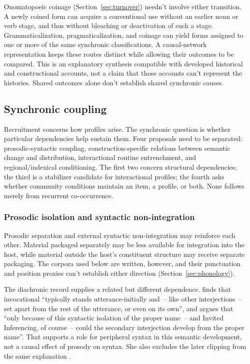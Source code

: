 \documentclass[12pt]{article}
\begin{document}
Onomatopoeic coinage (Section~\ref{sec:turnover}) needn't involve either transition. A newly coined form can acquire a conventional use without an earlier noun or verb stage, and thus without bleaching or deactivation of such a stage. Grammaticalization, pragmaticalization, and coinage can yield forms assigned to one or more of the same synchronic classifications. A causal-network representation keeps these routes distinct while allowing their outcomes to be compared. This is an explanatory synthesis compatible with developed historical and constructional accounts, not a claim that those accounts can't represent the histories. Shared outcomes alone don't establish shared synchronic causes.

\subsection{Synchronic coupling}\label{sec:synchronic-coupling}

Recruitment concerns how profiles arise. The synchronic question is whether particular dependencies help sustain them. Four proposals need to be separated: prosodic-syntactic coupling, construction-specific relations between semantic change and distribution, interactional routine entrenchment, and regional/indexical conditioning. The first two concern structural dependencies; the third is a stabilizer candidate for interactional profiles; the fourth asks whether community conditions maintain an item, a profile, or both. None follows merely from recurrent co-occurrence.

\subsubsection{Prosodic isolation and syntactic non-integration}

Prosodic separation and external syntactic non-integration may reinforce each other. Material packaged separately may be less available for integration into the host, while material outside the host's constituent structure may receive separate packaging. The corpora used below are written, however, and their punctuation and position proxies can't establish either direction (Section~\ref{sec:phonology}).

The diachronic record supplies a related but different dependence. \textcite[85]{gehweiler2008} finds that invocational  \enquote{typically stands utterance-initially and~-- like other interjections~-- set apart from the rest of the utterance, or even on its own}, and argues that \enquote{only because of this syntactic isolation of the proper name~-- and Invited Inferencing, of course~-- could the secondary interjection  develop from the proper name}. That supports a role for peripheral syntax in this semantic development, not a causal effect of prosody on syntax. She also excludes the later clipping from the same explanation \citep[88]{gehweiler2008}.
\end{document}
